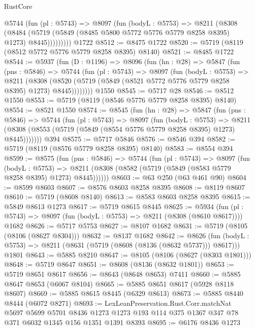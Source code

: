 \begin{lexlean}{RustCore}
\begin{coremodule}
          @5744
            (fun (pl : @5743) =>
            @8097
              (fun (bodyL : @5753) =>
              @8211
                (@8308
                  (@8484
                    (@5719 (@5849 (@8485 @5800 @5772 @5776 @5779 @8258 @8395) @1273) @8445)))))))))
    @1722
@8512 := @8475 @1722
@8520 := @5719 (@8119 (@8512 @5772 @5776 @5779 @8258 @8395) @8140)
@8521 := @8485 @1722
@8544 := @5937
    (fun (D : @1196) =>
    @8096
      (fun (hn : @28) =>
      @5847
        (fun (pns : @5846) =>
        @5744
          (fun (pl : @5743) =>
          @8097
            (fun (bodyL : @5753) =>
            @8211
              (@8308 (@8520 (@5719 (@5849 (@8521 @5772 @5776 @5779 @8258 @8395) @1273) @8445))))))))
    @1550
@8545 := @5717 @28
@8546 := @8512 @1550
@8553 := @5719 (@8119 (@8546 @5776 @5779 @8258 @8395) @8140)
@8554 := @8521 @1550
@8574 := @8545
    (fun (hn : @28) =>
    @5847
      (fun (pns : @5846) =>
      @5744
        (fun (pl : @5743) =>
        @8097
          (fun (bodyL : @5753) =>
          @8211 (@8308 (@8553 (@5719 (@5849 (@8554 @5776 @5779 @8258 @8395) @1273) @8445)))))))
    @394
@8575 := @5717 @5846
@8576 := @8546 @394
@8582 := @5719 (@8119 (@8576 @5779 @8258 @8395) @8140)
@8583 := @8554 @394
@8599 := @8575
    (fun (pns : @5846) =>
    @5744
      (fun (pl : @5743) =>
      @8097
        (fun (bodyL : @5753) =>
        @8211 (@8308 (@8582 (@5719 (@5849 (@8583 @5779 @8258 @8395) @1273) @8445))))))
@8603 := @63 @250 (@63 @461 @90)
@8604 := @8599 @8603
@8607 := @8576 @8603 @8258 @8395
@8608 := @8119 @8607
@8610 := @5719 (@8608 @8140)
@8613 := @8583 @8603 @8258 @8395
@8615 := @5849 @8613 @1273
@8617 := @5719 @8615 @8445
@8625 := @5934
    (fun (pl : @5743) => @8097 (fun (bodyL : @5753) => @8211 (@8308 (@8610 @8617))))
    @1682
@8626 := @5717 @5753
@8627 := @8107 @1682
@8631 := @5719 (@8105 (@8106 (@8627 @8304)))
@8632 := @8137 @1682
@8642 := @8626
    (fun (bodyL : @5753) => @8211 (@8631 (@5719 (@8608 (@8136 (@8632 @5737))) @8617)))
    @1801
@8643 := @5885 @8210
@8647 := @8105 (@8106 (@8627 (@8303 @1801)))
@8648 := @5719 @8647
@8651 := @8608 (@8136 (@8632 @1801))
@8653 := @5719 @8651 @8617
@8656 := @8643 (@8648 @8653) @7411
@8660 := @5885 @8647 @8653 (@6067 @8104)
@8665 := @5885 @8651 @8617 (@5928 @8118 @8607)
@8669 := @5885 @8615 @8445 (@6329 @8613)
@8673 := @5885 @8440 @8444 (@6072 @8271)
@8693 := LexLeanPreservation.Rust.Corr.matchNat
    @5697
    @5699
    @5701
    @8436
    @1273
    @1273
    @193
    @114
    @375
    @1367
    @347
    @78
    @371
    @6032
    @1345
    @156
    @1351
    @1391
    @8393
@8695 := @6176 @8436 @1273

\end{coremodule}
\end{lexlean}
